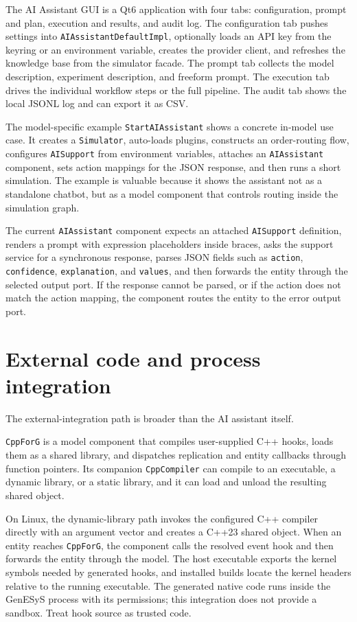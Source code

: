The AI Assistant GUI is a Qt6 application with four tabs: configuration, prompt and plan, execution and results, and audit log. The configuration tab pushes settings into \texttt{AIAssistantDefaultImpl}, optionally loads an API key from the keyring or an environment variable, creates the provider client, and refreshes the knowledge base from the simulator facade. The prompt tab collects the model description, experiment description, and freeform prompt. The execution tab drives the individual workflow steps or the full pipeline. The audit tab shows the local JSONL log and can export it as CSV.

The model-specific example \texttt{StartAIAssistant} shows a concrete in-model use case. It creates a \texttt{Simulator}, auto-loads plugins, constructs an order-routing flow, configures \texttt{AISupport} from environment variables, attaches an \texttt{AIAssistant} component, sets action mappings for the JSON response, and then runs a short simulation. The example is valuable because it shows the assistant not as a standalone chatbot, but as a model component that controls routing inside the simulation graph.

The current \texttt{AIAssistant} component expects an attached \texttt{AISupport} definition, renders a prompt with expression placeholders inside braces, asks the support service for a synchronous response, parses JSON fields such as \texttt{action}, \texttt{confidence}, \texttt{explanation}, and \texttt{values}, and then forwards the entity through the selected output port. If the response cannot be parsed, or if the action does not match the action mapping, the component routes the entity to the error output port.

\section{External code and process integration}
\label{sec:external-code-process-integration}

The external-integration path is broader than the AI assistant itself.

\texttt{CppForG} is a model component that compiles user-supplied C++ hooks, loads them as a shared library, and dispatches replication and entity callbacks through function pointers. Its companion \texttt{CppCompiler} can compile to an executable, a dynamic library, or a static library, and it can load and unload the resulting shared object.

On Linux, the dynamic-library path invokes the configured C++ compiler directly with an argument vector and creates a C++23 shared object. When an entity reaches \texttt{CppForG}, the component calls the resolved event hook and then forwards the entity through the model. The host executable exports the kernel symbols needed by generated hooks, and installed builds locate the kernel headers relative to the running executable. The generated native code runs inside the GenESyS process with its permissions; this integration does not provide a sandbox. Treat hook source as trusted code.

